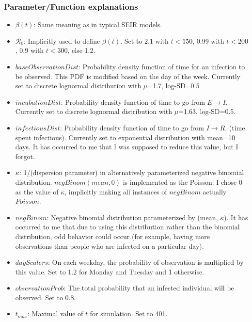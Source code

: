 \documentclass{article}
\newcommand{\nR}{\mathscr{R}}
\begin{document}
\subsubsection{Parameter/Function explanations}
\begin{itemize}
    \item $\beta(t)$: Same meaning as in typical SEIR models.
    \item $\nR_0$: Implicitly used to define $\beta(t)$. Set to 2.1 with $t < 150$, 0.99 with $t<200$, 0.9 with $t<300$, else 1.2.
    \item $baseObservationDist$: Probability density function of time for an infection to be observed. This PDF is modified based on the day of the week. Currently set to discrete lognormal distribution with $\mu$=1.7, log-SD=0.5 
    \item $incubationDist$: Probability density function of time to go from $E \rightarrow I$. Currently set to discrete lognormal distribution with $\mu$=1.63, log-SD=0.5. \cite{McAloon}
    \item $infectiousDist$: Probability density function of time to go from $I \rightarrow R$. (time spent infectious). Currently set to exponential distribution with mean=10 days. It has occurred to me that I was supposed to reduce this value, but I forgot. 
    \item $\kappa$: 1/(dispersion parameter) in alternatively parameterized negative binomial distribution. \cite{NegBinom} $negBinom(mean, 0)$ is implemented as the Poisson. I chose 0 as the value of $\kappa$, implicitly making all instances of $negBinom$ actually $Poisson$.
    \item $negBinom$: Negative binomial distribution parameterized by (mean, $\kappa$). It has occurred to me that due to using this distribution rather than the binomial distribution, odd behavior could occur (for example, having more observations than people who are infected on a particular day).
    \item $dayScalers$: On each weekday, the probability of observation is multiplied by this value. Set to 1.2 for Monday and Tuesday and 1 otherwise. 
    \item $observationProb$: The total probability that an infected individual will be observed. Set to 0.8.
    \item $t_{max}$: Maximal value of $t$ for simulation. Set to 401.
\end{itemize}
\end{document}
